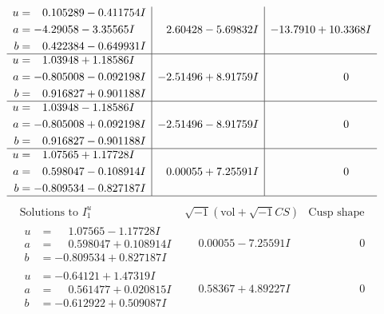 \documentclass[1p]{elsarticle_modified}
\theoremstyle{definition}
\newcommand{\I}{\sqrt{-1}}
\begin{document}
$$\begin{array}{c|c|c}
\begin{aligned}
u &= \phantom{-}0.105289 - 0.411754 I \\
a &= -4.29058 - 3.35565 I \\
b &= \phantom{-}0.422384 - 0.649931 I\end{aligned}
 & \phantom{-}2.60428 - 5.69832 I & -13.7910 + 10.3368 I \\ \hline\begin{aligned}
u &= \phantom{-}1.03948 + 1.18586 I \\
a &= -0.805008 - 0.092198 I \\
b &= \phantom{-}0.916827 + 0.901188 I\end{aligned}
 & -2.51496 + 8.91759 I & \phantom{-0.000000 } 0 \\ \hline\begin{aligned}
u &= \phantom{-}1.03948 - 1.18586 I \\
a &= -0.805008 + 0.092198 I \\
b &= \phantom{-}0.916827 - 0.901188 I\end{aligned}
 & -2.51496 - 8.91759 I & \phantom{-0.000000 } 0 \\ \hline\begin{aligned}
u &= \phantom{-}1.07565 + 1.17728 I \\
a &= \phantom{-}0.598047 - 0.108914 I \\
b &= -0.809534 - 0.827187 I\end{aligned}
 & \phantom{-}0.00055 + 7.25591 I & \phantom{-0.000000 } 0\\
 \hline 
 \end{array}$$\newpage$$\begin{array}{c|c|c}  
\text{Solutions to }I^u_{1}& \I (\text{vol} + \sqrt{-1}CS) & \text{Cusp shape}\\
 \hline 
\begin{aligned}
u &= \phantom{-}1.07565 - 1.17728 I \\
a &= \phantom{-}0.598047 + 0.108914 I \\
b &= -0.809534 + 0.827187 I\end{aligned}
 & \phantom{-}0.00055 - 7.25591 I & \phantom{-0.000000 } 0 \\ \hline\begin{aligned}
u &= -0.64121 + 1.47319 I \\
a &= \phantom{-}0.561477 + 0.020815 I \\
b &= -0.612922 + 0.509087 I\end{aligned}
 & \phantom{-}0.58367 + 4.89227 I & \phantom{-0.000000 } 0 \\ \hline\begin{aligned}

\end{aligned}
\end{array}$$
\end{document}
